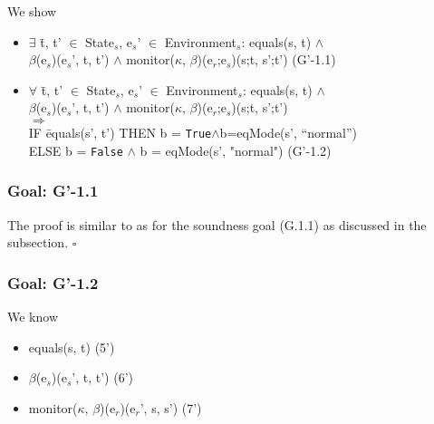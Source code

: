 \documentclass[conference]{IEEEtran}
\begin{document}
\noindent We show
\begin{itemize}
\item \begin{tabbing}$\exists$ \=t, t' $\in$ State$_s$, e$_s$' $\in$ Environment$_s$: equals(s, t) $\wedge$ 
\\\>\textlbrackdbl $\beta$\textrbrackdbl(e$_s$)(e$_s$', t, t') $\wedge$ monitor($\kappa$, $\beta$)(e$_r$;e$_s$)(s;t, s';t')  \hspace*{0.2cm} (G'-1.1)\end{tabbing}
\item \begin{tabbing}$\forall$ \=t, t' $\in$ State$_s$, e$_s$' $\in$ Environment$_s$: equals(s, t) $\wedge$ 
\\\>\textlbrackdbl $\beta$\textrbrackdbl(e$_s$)(e$_s$', t, t') $\wedge$ monitor($\kappa$, $\beta$)(e$_r$;e$_s$)(s;t, s';t')
\\\>$\Rightarrow$ \=
\\\>\>IF \=equals(s', t')  THEN b = \texttt{True}$\wedge$b=eqMode(s', ``normal'')
\\\>\>ELSE b = \texttt{False} $\wedge$ b = eqMode(s', "normal")   \hspace*{0.3cm} (G'-1.2) \end{tabbing}
 \end{itemize}
 
\subsubsection*{Goal: G'-1.1}

The proof is similar to as for the soundness goal (G.1.1) as discussed in the subsection. $\square$

\subsubsection*{Goal: G'-1.2}

\noindent We know

\begin{itemize}
\item equals(s, t)   \hspace*{3.5cm} (5')
\item \textlbrackdbl $\beta$\textrbrackdbl(e$_s$)(e$_s$', t, t')  \hspace*{2.7cm} (6')
\item monitor($\kappa$, $\beta$)(e$_r$)(e$_r$', s, s')  \hspace*{1.4cm} (7')
\end{itemize}
\end{document}
